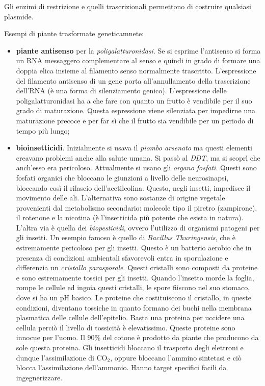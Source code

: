 \documentclass[]{article}
\begin{document}
Gli enzimi di restrizione e quelli trascrizionali permettono di
costruire qualsiasi plasmide.

Esempi di piante trasformate geneticamnete:

\begin{itemize}
\itemsep1pt\parskip0pt
\item
  \textbf{piante antisenso} per la \emph{poligalatturonidasi}. Se si
  esprime l'antisenso si forma un RNA messaggero complementare al senso
  e quindi in grado di formare una doppia elica insieme al filamento
  senso normalmente trascritto. L'espressione del filamento antisenso di
  un gene porta all'annullamento della trascrizione dell'RNA (è una
  forma di silenziamento genico). L'espressione delle
  poligalatturonidasi ha a che fare con quanto un frutto è vendibile per
  il suo grado di maturazione. Questa espressione viene silenziata per
  impedirne una maturazione precoce e per far sì che il frutto sia
  vendibile per un periodo di tempo più lungo;
\item
  \textbf{bioinsetticidi}. Inizialmente si usava il \emph{piombo
  arsenato} ma questi elementi creavano problemi anche alla salute
  umana. Si passò al \emph{DDT}, ma si scoprì che anch'esso era
  pericoloso. Attualmente si usano gli \emph{organo fosfati}. Questi
  sono fosfati organici che bloccano le giunzioni a livello delle
  neurosinapsi, bloccando così il rilascio dell'acetilcolina. Questo,
  negli insetti, impedisce il movimento delle ali. L'alternativa sono
  sostanze di origine vegetale provenienti dal metabolismo secondario:
  molecole tipo il piretro (zampirone), il rotenone e la nicotina (è
  l'insetticida più potente che esista in natura). L'altra via è quella
  dei \emph{biopesticidi}, ovvero l'utilizzo di organismi patogeni per
  gli insetti. Un esempio famoso è quello di \emph{Bacillus
  Thuringensis}, che è estremamente pericoloso per gli insetti. Questo è
  un batterio aerobio che in presenza di condizioni ambientali
  sfavorevoli entra in sporulazione e differenzia un \emph{cristallo
  parasporale}. Questi cristalli sono composti da proteine e sono
  estremamente tossici per gli insetti. Quando l'insetto morde la
  foglia, rompe le cellule ed ingoia questi cristalli, le spore fiiscono
  nel suo stomaco, dove si ha un pH basico. Le proteine che
  costituiscono il cristallo, in queste condizioni, diventano tossiche
  in quanto formano dei buchi nella membrana plasmatica delle cellule
  dell'epitelio. Basta una proteina per uccidere una cellula perciò il
  livello di tossicità è elevatissimo. Queste proteine sono innocue per
  l'uomo. Il 90\% del cotone è prodotto da piante che producono da sole
  questa proteina. Gli insetticidi bloccano il trasporto degli elettroni
  e dunque l'assimilazione di CO$_2$, oppure bloccano l'ammino sintetasi
  e ciò blocca l'assimilazione dell'ammonio. Hanno target specifici
  facili da ingegnerizzare.
\end{itemize}
\end{document}
